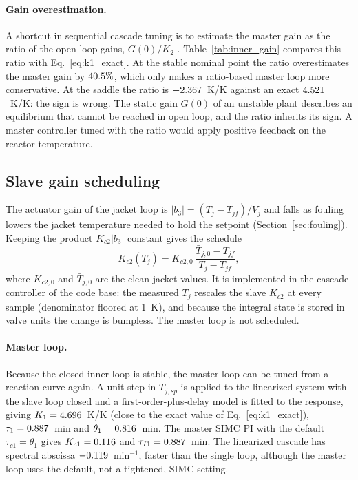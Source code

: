 \paragraph{Gain overestimation.} A shortcut in sequential cascade tuning is to estimate the master gain as the ratio of the open-loop gains, $G(0)/K_2$ \cite{seborg2010process,shinskey1996process,luyben2007chemical}. Table~\ref{tab:inner_gain} compares this ratio with Eq.~\eqref{eq:k1_exact}. At the stable nominal point the ratio overestimates the master gain by $40.5\%$, which only makes a ratio-based master loop more conservative. At the saddle the ratio is $-2.367$~K/K against an exact $4.521$~K/K: the sign is wrong. The static gain $G(0)$ of an unstable plant describes an equilibrium that cannot be reached in open loop, and the ratio inherits its sign. A master controller tuned with the ratio would apply positive feedback on the reactor temperature.



\subsection{Slave gain scheduling}
\label{subsec:gs}
The actuator gain of the jacket loop is $|b_3|=(\bar T_j-T_{jf})/V_j$ and falls as fouling lowers the jacket temperature needed to hold the setpoint (Section~\ref{sec:fouling}). Keeping the product $K_{c2}|b_3|$ constant gives the schedule
\begin{equation}
K_{c2}(T_j)=K_{c2,0}\,\frac{\bar T_{j,0}-T_{jf}}{T_j-T_{jf}},
\label{eq:gs_slave}
\end{equation}
where $K_{c2,0}$ and $\bar T_{j,0}$ are the clean-jacket values. It is implemented in the cascade controller of the code base: the measured $T_j$ rescales the slave $K_{c2}$ at every sample (denominator floored at 1~K), and because the integral state is stored in valve units the change is bumpless. The master loop is not scheduled.

\paragraph{Master loop.} Because the closed inner loop is stable, the master loop can be tuned from a reaction curve again. A unit step in $T_{j,sp}$ is applied to the linearized system with the slave loop closed and a first-order-plus-delay model is fitted to the response, giving $K_1=4.696$~K/K (close to the exact value of Eq.~\eqref{eq:k1_exact}), $\tau_1=0.887$~min and $\theta_1=0.816$~min. The master SIMC PI with the default $\tau_{c1}=\theta_1$ gives $K_{c1}=0.116$ and $\tau_{I1}=0.887$~min. The linearized cascade has spectral abscissa $-0.119$~min$^{-1}$, faster than the single loop, although the master loop uses the default, not a tightened, SIMC setting.

